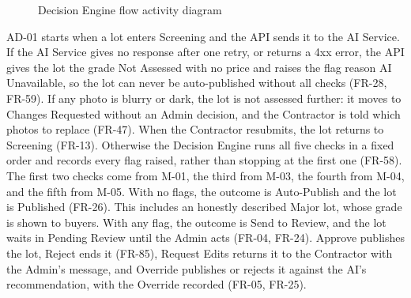 \begin{figure}[H]
\caption{Decision Engine flow activity diagram}
\label{fig:ad-01}
\end{figure}

AD-01 starts when a lot enters Screening and the API sends it to the AI Service.
If the AI Service gives no response after one retry, or returns a 4xx error, the
API gives the lot the grade Not Assessed with no price and raises the flag reason
AI Unavailable, so the lot can never be auto-published without all checks (FR-28,
FR-59). If any photo is blurry or dark, the lot is not assessed further: it moves to
Changes Requested without an Admin decision, and the Contractor is told which photos
to replace (FR-47). When the Contractor resubmits, the lot returns to Screening
(FR-13). Otherwise the Decision Engine runs all five checks in a fixed order and
records every flag raised, rather than stopping at the first one (FR-58). The first
two checks come from M-01, the third from M-03, the fourth from M-04, and the fifth
from M-05. With no flags, the outcome is Auto-Publish and the lot is Published
(FR-26). This includes an honestly described Major lot, whose grade is shown to
buyers. With any flag, the outcome is Send to Review, and the lot waits in
Pending Review until the Admin acts (FR-04, FR-24). Approve publishes the lot, Reject
ends it (FR-85), Request Edits returns it to the Contractor with the Admin's message,
and Override publishes or rejects it against the AI's recommendation, with the
Override recorded (FR-05, FR-25).

